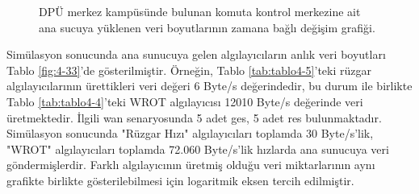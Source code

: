 \begin{figure}[htbp]
\centering



\caption{DPÜ merkez kampüsünde bulunan komuta kontrol merkezine ait ana sucuya yüklenen veri boyutlarının zamana bağlı değişim grafiği.}
\label{fig:4-32}
\end{figure}


Simülasyon sonucunda ana sunucuya gelen algılayıcıların anlık veri boyutları Tablo \ref{fig:4-33}’de gösterilmiştir. Örneğin, Tablo \ref{tab:tablo4-5}’teki rüzgar algılayıcılarının ürettikleri veri değeri 6 Byte/s değerindedir, bu durum ile birlikte Tablo \ref{tab:tablo4-4}’teki WROT algılayıcısı 12010 Byte/s değerinde veri üretmektedir. İlgili \gls{wan} senaryosunda 5 adet \gls{ges}, 5 adet \gls{res} bulunmaktadır. Simülasyon sonucunda "Rüzgar Hızı" algılayıcıları toplamda 30 Byte/s'lik, "WROT" algılayıcıları toplamda 72.060 Byte/s'lik hızlarda ana sunucuya veri göndermişlerdir. Farklı algılayıcının üretmiş olduğu veri miktarlarının aynı grafikte birlikte gösterilebilmesi için logaritmik eksen tercih edilmiştir. 




